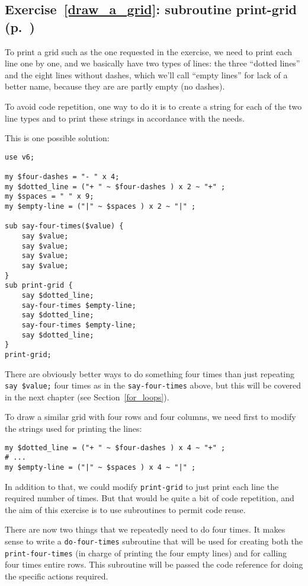 \subsection{Exercise~\ref{draw_a_grid}: subroutine print-grid 
(p.~\pageref{draw_a_grid})}
\label{sol_draw_a_grid}

To print a grid such as the one requested in the exercise, 
we need to print each line one by one, and we basically 
have two types of lines: the three ``dotted lines'' and 
the eight lines without dashes, which we'll call ``empty 
lines'' for lack of a better name, because they are are 
partly empty (no dashes).

To avoid code repetition, one way to do it is to create 
a string for each of the two line types and to print 
these strings in accordance with the needs.

This is one possible solution:

\begin{verbatim}
use v6;

my $four-dashes = "- " x 4;
my $dotted_line = ("+ " ~ $four-dashes ) x 2 ~ "+" ;
my $spaces = " " x 9;
my $empty-line = ("|" ~ $spaces ) x 2 ~ "|" ;

sub say-four-times($value) {
    say $value;
    say $value;
    say $value;
    say $value;
}
sub print-grid {
    say $dotted_line;
    say-four-times $empty-line;
    say $dotted_line;
    say-four-times $empty-line;
    say $dotted_line;
}
print-grid;
\end{verbatim}

There are obviously better ways to do something four times 
than just repeating \verb'say $value;' four times as in the 
{\tt say-four-times} above, but this will be covered in 
the next chapter (see Section~\ref{for_loops}).

To draw a similar grid with four rows and four columns, we need 
first to modify the strings used for printing the lines:

\begin{verbatim}
my $dotted_line = ("+ " ~ $four-dashes ) x 4 ~ "+" ;
# ...
my $empty-line = ("|" ~ $spaces ) x 4 ~ "|" ;
\end{verbatim}

In addition to that, we could modify {\tt print-grid} to just print 
each line the required number of times. But that would be 
quite a bit of code repetition, and the aim of this exercise 
is to use subroutines to permit code reuse.

There are now two things that we repeatedly need to do four times. 
It makes sense to write a {\tt do-four-times} subroutine that 
will be used for creating both the {\tt print-four-times} (in 
charge of printing the four empty lines) and for calling 
four times entire rows. This subroutine will be passed the 
code reference for doing the specific actions required.

